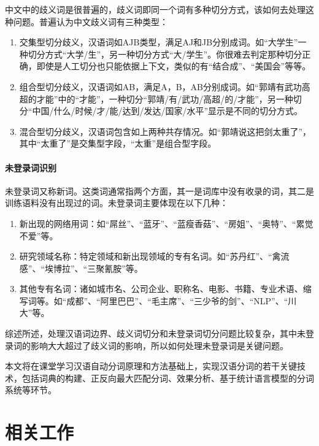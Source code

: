 \documentclass[11pt,a4paper]{article}
\begin{document}
中文中的歧义词是很普遍的，歧义词即同一个词有多种切分方式，该如何去处理这种问题。普遍认为中文歧义词有三种类型：
\begin{enumerate}
	\item 交集型切分歧义，汉语词如AJB类型，满足AJ和JB分别成词。如“大学生”一种切分方式“大学/生”，另一种切分方式“大/学生”。你很难去判定那种切分正确，即使是人工切分也只能依据上下文，类似的有“结合成”、“美国会”等等。
	
	\item 组合型切分歧义，汉语词如AB，满足A，B，AB分别成词。如“郭靖有武功高超的才能”中的“才能”，一种切分“郭靖/有/武功/高超/的/才能”，另一种切分“中国/什么/时候/才/能/达到/发达/国家/水平”显示是不同的切分方式。
	
	\item 混合型切分歧义，汉语词包含如上两种共存情况。如“郭靖说这把剑太重了”，其中“太重了”是交集型字段，“太重”是组合型字段。
\end{enumerate}


\paragraph{未登录词识别}

未登录词又称新词。这类词通常指两个方面，其一是词库中没有收录的词，其二是训练语料没有出现过的词。未登录词主要体现在以下几种：

\begin{enumerate}
\item 新出现的网络用词：如“屌丝”、“蓝牙”、“蓝瘦香菇”、“房姐”、“奥特”、“累觉不爱”等。

\item 研究领域名称：特定领域和新出现领域的专有名词。如“苏丹红”、“禽流感”、“埃博拉”、“三聚氰胺”等。

\item 其他专有名词：诸如城市名、公司企业、职称名、电影、书籍、专业术语、缩写词等。如“成都”、“阿里巴巴”、“毛主席”、“三少爷的剑”、“NLP”、“川大”等。
\end{enumerate}

综述所述，处理汉语词边界、歧义词切分和未登录词切分问题比较复杂，其中未登录词的影响大大超过了歧义词的影响，所以如何处理未登录词是关键问题。

本文将在课堂学习汉语自动分词原理和方法基础上，实现汉语分词的若干关键技术，包括词典的构建、正反向最大匹配分词、效果分析、基于统计语言模型的分词系统等环节。

\section{相关工作}
\end{document}
